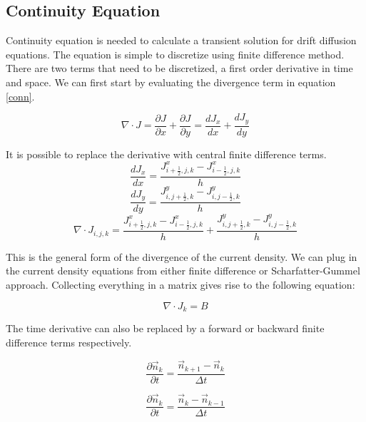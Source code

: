 \clearpage
\subsection{Continuity Equation}
Continuity equation is needed to calculate a transient solution for drift diffusion equations. The equation is simple to discretize using finite difference method. There are two terms that need to be discretized, a first order derivative in time and space. We can first start by evaluating the divergence term in equation \eqref{conn}.

\begin{equation}
\nabla \cdot J=\frac{\partial J}{\partial x}+\frac{\partial J}{\partial y}=\frac{d J_x}{d x}+\frac{d J_y}{d y}
\end{equation}

It is possible to replace the derivative with central finite difference terms.
\begin{equation}
\frac{d J_x}{d x}=\frac{J^x_{i+\frac{1}{2},j,k}-J^x_{i-\frac{1}{2},j,k}}{h}
\end{equation}
\begin{equation}
\frac{d J_y}{d y}=\frac{J^y_{i,j+\frac{1}{2},k}-J^y_{i,j-\frac{1}{2},k}}{h}
\end{equation}
\begin{equation}
\nabla \cdot J_{i,j,k}=\frac{J^x_{i+\frac{1}{2},j,k}-J^x_{i-\frac{1}{2},j,k}}{h}+\frac{J^y_{i,j+\frac{1}{2},k}-J^y_{i,j-\frac{1}{2},k}}{h}
\end{equation}

This is the general form of the divergence of the current density. We can plug in the current density equations from either finite difference or Scharfatter-Gummel approach. Collecting everything in a matrix gives rise to the following equation:

\begin{equation}
\nabla \cdot J_k =B
\label{fd_div}
\end{equation}

The time derivative can also be replaced by a forward or backward finite difference terms respectively.

\begin{equation}
\frac{\partial  \vec{n}_k}{\partial t}=\frac{ \vec{n}_{k+1}-\vec{n}_k}{\Delta t}
\label{forwardtime}
\end{equation}

\begin{equation}
\frac{\partial \vec{n}_k}{\partial t}=\frac{ \vec{n}_k- \vec{n}_{k-1}}{\Delta t}
\label{backwardtime}
\end{equation}

